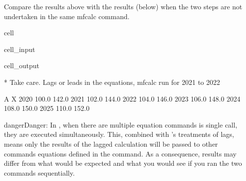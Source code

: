 \documentclass[letterpaper,10pt,english]{jupyterBook}
\begin{document}
\sphinxAtStartPar
Compare the results above with the results (below) when the two steps are not undertaken in the same mfcalc command.

\begin{sphinxuseclass}{cell}\begin{sphinxVerbatimInput}

\begin{sphinxuseclass}{cell_input}
\begin{sphinxVerbatim}[commandchars=\\\{\}]
  

  
\end{sphinxVerbatim}

\end{sphinxuseclass}\end{sphinxVerbatimInput}
\begin{sphinxVerbatimOutput}

\begin{sphinxuseclass}{cell_output}
\begin{sphinxVerbatim}[commandchars=\\\{\}]
* Take care. Lags or leads in the equations, mfcalc run for 2021 to 2022
\end{sphinxVerbatim}

\begin{sphinxVerbatim}[commandchars=\\\{\}]
          A      X
2020  100.0  142.0
2021  102.0  144.0
2022  104.0  146.0
2023  106.0  148.0
2024  108.0  150.0
2025  110.0  152.0
\end{sphinxVerbatim}

\end{sphinxuseclass}\end{sphinxVerbatimOutput}

\end{sphinxuseclass}
\begin{sphinxadmonition}{danger}{Danger:}
\sphinxAtStartPar
In , when there are multiple equation commands is single call, they are executed simultaneously. This, combined with ’s  treatments of lags, means only the results of the lagged calculation will be passed to other commands equations defined in the  command. As a consequence, results may differ from what would be expected and what you would see if you ran the two commands sequentially.
\end{sphinxadmonition}
\end{document}
